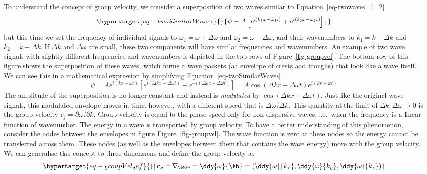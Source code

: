\documentclass[
  letterpaper,
  twocolumn,
  landscape]{report}
\begin{document}
To understand the concept of group velocity, we consider a superposition
of two waves similar to Equation~\ref{eq-twowaves_1_2}
\begin{equation}\protect\hypertarget{eq-twoSimilarWaves}{}{
    \psi = A \left[ e^{i ( k_1 x - \omega_1 t)} + e^{i (k_2 x - \omega_2 t) } \right], 
}\label{eq-twoSimilarWaves}\end{equation} but this time we set the
frequency of individual signals to \(\omega_1 = \omega + \Delta \omega\)
and \(\omega_2 = \omega - \Delta \omega\), and their wavenumbers to
\(k_1 = k + \Delta k\) and \(k_2 = k - \Delta k\). If \(\Delta k\) and
\(\Delta \omega\) are small, these two components will have similar
frequencies and wavenumbers. An example of two wave signals with
slightly different frequencies and wavenumbers is depicted in the top
rows of Figure~\ref{fig-groupvel}. The bottom row of this figure shows
the superposition of these waves, which forms a wave packets (an
envelope of crests and troughs) that look like a wave itself. We can see
this in a mathematical expression by simplifying
Equation~\ref{eq-twoSimilarWaves} \[
    \psi = A e^{i ( k x - \omega t)} \left[ e^{i ( \Delta k x - \Delta \omega t)} + e^{- i ( \Delta k x - \Delta \omega t)}  \right] = A \cos (\Delta k x - \Delta \omega t) e^{i ( k x - \omega t)}   
\] The amplitude of the superposition is no longer constant and instead
is \emph{modulated} by \(\cos(\Delta k x - \Delta \omega t)\). Just like
the original wave signals, this modulated envelope moves in time,
however, with a different speed that is \(\Delta \omega / \Delta k\).
This quantity at the limit of \(\Delta k, \Delta \omega \to 0\) is the
group velocity \(c_g = \partial \omega / \partial k\). Group velocity is
equal to the phase speed only for non-dispersive waves, i.e.~when the
frequency is a linear function of wavenumber. The energy in a wave is
transported by group velocity. To have a better understanding of this
phenomenon, consider the nodes between the envelopes in figure
Figure~\ref{fig-groupvel}. The wave function is zero at these nodes so
the energy cannot be transferred across them. These nodes (as well as
the envelopes between them that contains the wave energy) move with the
group velocity. We can generalise this concept to three dimensions and
define the group velocity as
\begin{equation}\protect\hypertarget{eq-groupVel_def}{}{
    \boldsymbol{c}_g = \nabla_{\kb} \omega = \ddy{\omega}{\kb} = \left(\ddy{\omega}{k_x}, \ddy{\omega}{k_y}, \ddy{\omega}{k_z} \right)
}\label{eq-groupVel_def}\end{equation}
\end{document}
